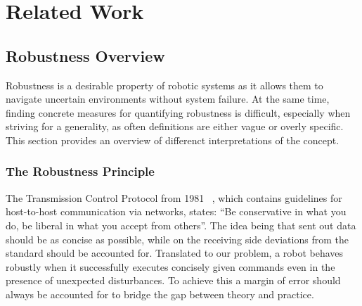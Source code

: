 \setcounter{chapter}{1}

\chapter{Related Work}


\section{Robustness Overview} \label{Robustness Overview}
Robustness is a desirable property of robotic systems as it allows them to navigate uncertain environments without system failure. At the same time, finding concrete measures for quantifying robustness is difficult, especially when striving for a generality, as often definitions are either vague or overly specific.
This section provides an overview of differenct interpretations of the concept. 



\subsection{The Robustness Principle} \label{The Robustness Principle}
The Transmission Control Protocol from 1981 ~\cite{trm}, which contains guidelines for host-to-host communication via networks, states: “Be conservative in what you do, be liberal in what you accept from others”. The idea being that sent out data should be as concise as possible, while on the receiving side deviations from the standard should be accounted for. Translated to our problem, a robot behaves robustly when it successfully executes concisely given commands even in the presence of unexpected disturbances. To achieve this a margin of error should always be accounted for to bridge the gap between theory and practice.




